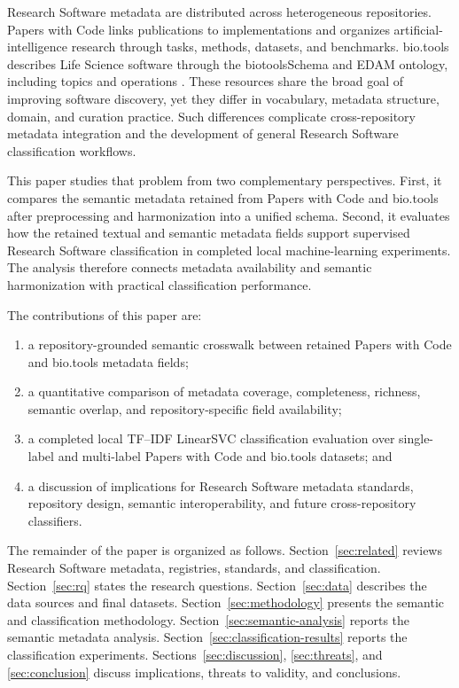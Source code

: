 \documentclass[pdflatex,sn-mathphys-num]{sn-jnl}%
\theoremstyle{thmstyleone}%
\theoremstyle{thmstyletwo}%
\theoremstyle{thmstylethree}%
\begin{document}
Research Software metadata are distributed across heterogeneous repositories. Papers with Code links publications to implementations and organizes artificial-intelligence research through tasks, methods, datasets, and benchmarks. bio.tools describes Life Science software through the biotoolsSchema and EDAM ontology, including topics and operations \cite{Ison2013EDAM,Ison2019BioTools,Ison2021BioToolsSchema}. These resources share the broad goal of improving software discovery, yet they differ in vocabulary, metadata structure, domain, and curation practice. Such differences complicate cross-repository metadata integration and the development of general Research Software classification workflows.

This paper studies that problem from two complementary perspectives. First, it compares the semantic metadata retained from Papers with Code and bio.tools after preprocessing and harmonization into a unified schema. Second, it evaluates how the retained textual and semantic metadata fields support supervised Research Software classification in completed local machine-learning experiments. The analysis therefore connects metadata availability and semantic harmonization with practical classification performance.

The contributions of this paper are:

\begin{enumerate}
\item a repository-grounded semantic crosswalk between retained Papers with Code and bio.tools metadata fields;
\item a quantitative comparison of metadata coverage, completeness, richness, semantic overlap, and repository-specific field availability;
\item a completed local TF--IDF LinearSVC classification evaluation over single-label and multi-label Papers with Code and bio.tools datasets; and
\item a discussion of implications for Research Software metadata standards, repository design, semantic interoperability, and future cross-repository classifiers.
\end{enumerate}

The remainder of the paper is organized as follows. Section~\ref{sec:related} reviews Research Software metadata, registries, standards, and classification. Section~\ref{sec:rq} states the research questions. Section~\ref{sec:data} describes the data sources and final datasets. Section~\ref{sec:methodology} presents the semantic and classification methodology. Section~\ref{sec:semantic-analysis} reports the semantic metadata analysis. Section~\ref{sec:classification-results} reports the classification experiments. Sections~\ref{sec:discussion}, \ref{sec:threats}, and \ref{sec:conclusion} discuss implications, threats to validity, and conclusions.
\end{document}

